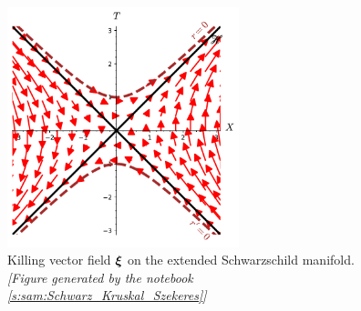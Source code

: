 \begin{figure}
\centerline{\includegraphics[width=0.6\textwidth]{max_xi_extend.pdf}}
\caption[]{\label{f:sch:xi_extend} \footnotesize
Killing vector field $\bm{\xi}$ on the extended Schwarzschild manifold.
\textsl{[Figure generated by the notebook \ref{s:sam:Schwarz_Kruskal_Szekeres}]}
}
\end{figure}

